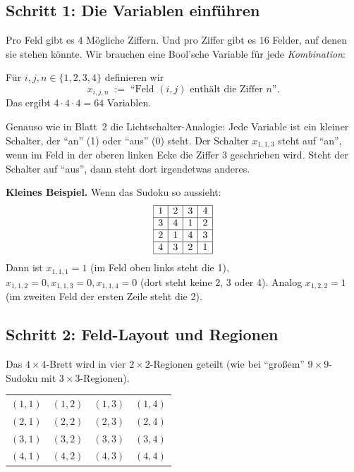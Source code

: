 \documentclass[a4paper,12pt]{article}
\begin{document}
\subsection*{Schritt 1: Die Variablen einf\"uhren}

Pro Feld gibt es $4$ M\"ogliche Ziffern. Und pro Ziffer gibt es $16$
Felder, auf denen sie stehen k\"onnte. Wir brauchen eine
Bool'sche Variable f\"ur jede \emph{Kombination}:

\begin{merkbox}[title={Die Variablen}]
F\"ur $i, j, n \in \{1, 2, 3, 4\}$ definieren wir
\[
x_{i,j,n} \;:=\; \text{``Feld $(i,j)$ enth\"alt die Ziffer $n$''}.
\]
Das ergibt $4 \cdot 4 \cdot 4 = 64$ Variablen.
\end{merkbox}

\begin{analogie}
Genauso wie in Blatt~2 die Lichtschalter-Analogie: Jede Variable ist
ein kleiner Schalter, der "`an"' (1) oder "`aus"' (0) steht. Der
Schalter $x_{1,1,3}$ steht auf "`an"', wenn im Feld in der oberen
linken Ecke die Ziffer $3$ geschrieben wird. Steht der Schalter auf
"`aus"', dann steht dort irgendetwas anderes.
\end{analogie}

\textbf{Kleines Beispiel.} Wenn das Sudoku so aussieht:
\[
\begin{array}{|c|c|c|c|}
\hline
1 & 2 & 3 & 4 \\ \hline
3 & 4 & 1 & 2 \\ \hline
2 & 1 & 4 & 3 \\ \hline
4 & 3 & 2 & 1 \\ \hline
\end{array}
\]
Dann ist $x_{1,1,1} = 1$ (im Feld oben links steht die 1), $x_{1,1,2}
= 0, x_{1,1,3} = 0, x_{1,1,4} = 0$ (dort steht keine 2, 3 oder 4).
Analog $x_{1,2,2} = 1$ (im zweiten Feld der ersten Zeile steht die 2).

\subsection*{Schritt 2: Feld-Layout und Regionen}

Das $4 \times 4$-Brett wird in vier $2 \times 2$-Regionen geteilt
(wie bei "`gro{\ss}em"' $9 \times 9$-Sudoku mit $3 \times 3$-Regionen).

\begin{center}
\renewcommand{\arraystretch}{1.5}
\begin{tabular}{|cc|cc|}
\hline
$(1,1)$ & $(1,2)$ & $(1,3)$ & $(1,4)$ \\
$(2,1)$ & $(2,2)$ & $(2,3)$ & $(2,4)$ \\ \hline
$(3,1)$ & $(3,2)$ & $(3,3)$ & $(3,4)$ \\
$(4,1)$ & $(4,2)$ & $(4,3)$ & $(4,4)$ \\ \hline
\end{tabular}
\end{center}
\end{document}
